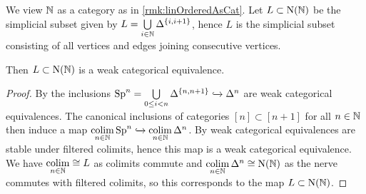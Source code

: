 \begin{lemma}\label{lem:spineInclIsWCE}
    We view $\mathbb{N}$ as a category as in \cref{rmk:linOrderedAsCat}.
    Let $L\subset\operatorname{N}(\mathbb{N})$ be the simplicial subset given by $L=\bigcup\limits_{i\in\mathbb{N}}\Delta^{\left\lbrace i,i+1\right\rbrace}$, hence $L$ is the simplicial subset consisting of all vertices and edges joining consecutive vertices.
    
    Then $L\subset\operatorname{N}(\mathbb{N})$ is a weak categorical equivalence.
    \begin{proof}
        By \cite[Proposition 3.7.4]{cisinski_2019} the inclusions $\operatorname{Sp}^n=\bigcup\limits_{0\leq i<n}\Delta^{\left\lbrace n,n+1\right\rbrace}\xhookrightarrow{}\Delta^n$ are weak categorical equivalences.
        The canonical inclusions of categories $[n]\subset[n+1]$ for all $n\in\mathbb{N}$ then induce a map $\operatorname*{colim}\limits_{n\in\mathbb{N}}\operatorname{Sp}^n\xhookrightarrow{}\operatorname*{colim}\limits_{n\in\mathbb{N}}\Delta^n$.
        By \cite[Corollary 3.9.8]{cisinski_2019} weak categorical equivalences are stable under filtered colimits, hence this map is a weak categorical equivalence.
        We have $\operatorname*{colim}\limits_{n\in\mathbb{N}}\cong L$ as colimits commute and $\operatorname*{colim}\limits_{n\in\mathbb{N}}\Delta^n\cong\operatorname{N}(\mathbb{N})$ as the nerve commutes with filtered colimits, so this corresponds to the map $L\subset\operatorname{N}(\mathbb{N})$.
    \end{proof}
\end{lemma}
